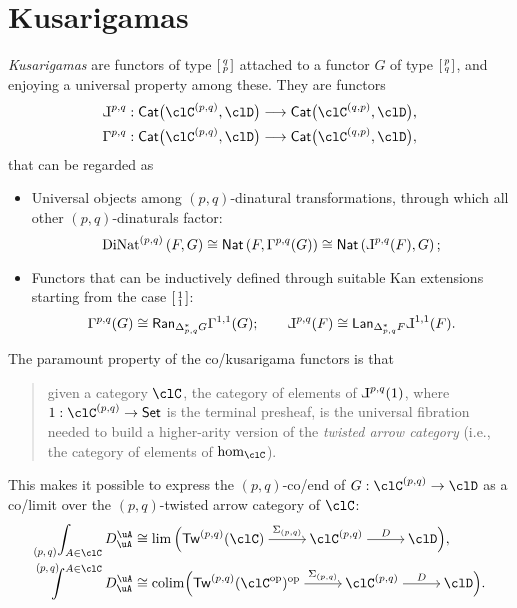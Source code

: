 \documentclass[11pt]{amsart}
\begin{document}
\section{Kusarigamas}
\label{sec:orgade2373}
\emph{Kusarigamas} are functors of type $\typepq{q}{p}$ attached to a functor $G$ of type $\typepq{p}{q}$, and enjoying a universal property among these. They are functors 
\begin{align*}
	\ckgfpq{p}{q} & : \Cat\big(\pq{\clC},\clD\big)\longrightarrow\Cat\big(\pq{\clC}[q][p],\clD\big), \\
	\kgfpq{p}{q}  & : \Cat\big(\pq{\clC},\clD\big)\longrightarrow\Cat\big(\pq{\clC}[q][p],\clD\big), 
\end{align*}
that can be regarded as
\begin{itemize}
	\item Universal objects among $(p,q)$-dinatural transformations, through which all other $(p,q)$-dinaturals factor:%
	      \[ \pqDiNat{p}{q}\left(F,G\right)                 \cong \Nat\left(F,\kgpq{p}{q}{G}\right)             \cong \Nat\left(\ckgpq{p}{q}{F},G\right);\]
	\item Functors that can be inductively defined through suitable Kan extensions%
	starting from the case $\typepq{1}{1}$:
	      \[ \kgpq{p}{q}{G} \cong \Ran_{\pqdiag^*G}{\kgpq{1}{1}{G}}; \qquad \ckgpq{p}{q}{F} \cong \Lan_{\pqdiag^* F}{\ckgpq{1}{1}{F}}.\]
\end{itemize}
The paramount property of the co/kusarigama functors is that 
\begin{quote}
	given a category $\clC$, the category of elements of $\ckgpq{p}{q}{1}$, where $1 : \pq{\clC} \to \textsf{Set}$ is the terminal presheaf, is the universal fibration needed to build a higher-arity version of the \emph{twisted arrow category} (i.e., the category of elements of $\hom_\clC$).
\end{quote}
This makes it possible to express the $(p,q)$-co/end of $G : \pq{\clC} \to \clD$ as a co/limit over the $(p,q)$-twisted arrow category of $\clC$: 
\begin{align*}
	\pqEnd{p}{q}{A\in\clC}D^{\uA}_{\uA}   & \cong \lim\Big(\pqTw{p}{q}{\clC}\xloongrightarrow{\Sigma_{(p,q)}}\pq{\clC}\xloongrightarrow{D}\clD\Big),               \\
	\pqCoend{p}{q}{A\in\clC}D^{\uA}_{\uA} & \cong \colim\Big(\pqTw{p}{q}{\clC^{\op}}^{\op}\xloongrightarrow{\Sigma_{(p,q)}}\pq{\clC}\xloongrightarrow{D}\clD\Big).
\end{align*}
\end{document}
